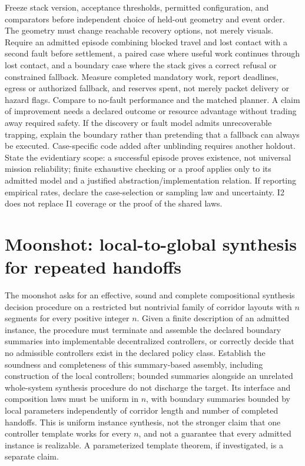 \documentclass[11pt]{article}
\begin{document}
Freeze stack version, acceptance thresholds, permitted configuration, and comparators before independent choice of held-out geometry and event order. The geometry must change reachable recovery options, not merely visuals. Require an admitted episode combining blocked travel and lost contact with a second fault before settlement, a paired case where useful work continues through lost contact, and a boundary case where the stack gives a correct refusal or constrained fallback. Measure completed mandatory work, report deadlines, egress or authorized fallback, and reserves spent, not merely packet delivery or hazard flags. Compare to no-fault performance and the matched planner. A claim of improvement needs a declared outcome or resource advantage without trading away required safety. If the discovery or fault model admits unrecoverable trapping, explain the boundary rather than pretending that a fallback can always be executed. Case-specific code added after unblinding requires another holdout. State the evidentiary scope: a successful episode proves existence, not universal mission reliability; finite exhaustive checking or a proof applies only to its admitted model and a justified abstraction/implementation relation. If reporting empirical rates, declare the case-selection or sampling law and uncertainty. I2 does not replace I1 coverage or the proof of the shared laws.

\section{Moonshot: local-to-global synthesis for repeated handoffs}\label{sec:moonshot}
The moonshot asks for an effective, sound and complete compositional synthesis decision procedure on a restricted but nontrivial family of corridor layouts with $n$ segments for every positive integer $n$. Given a finite description of an admitted instance, the procedure must terminate and assemble the declared boundary summaries into implementable decentralized controllers, or correctly decide that no admissible controllers exist in the declared policy class. Establish the soundness and completeness of this summary-based assembly, including construction of the local controllers; bounded summaries alongside an unrelated whole-system synthesis procedure do not discharge the target. Its interface and composition laws must be uniform in $n$, with boundary summaries bounded by local parameters independently of corridor length and number of completed handoffs. This is uniform instance synthesis, not the stronger claim that one controller template works for every $n$, and not a guarantee that every admitted instance is realizable. A parameterized template theorem, if investigated, is a separate claim.
\end{document}
